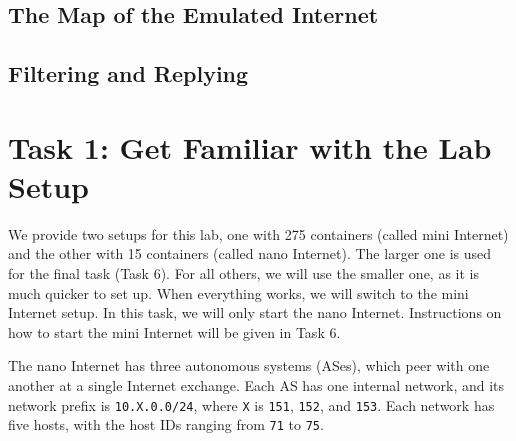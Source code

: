 


\subsection{The Map of the Emulated Internet} 




\subsection{Filtering and Replying} 






\section{Task 1: Get Familiar with the Lab Setup } 

We provide two setups for this lab, 
one with 275 containers (called mini Internet)
and the other with 15 containers (called nano Internet).
The larger one is used for the final task (Task 6). For 
all others, we will use the smaller one, as it is much
quicker to set up. When everything works, we will
switch to the mini Internet setup. In this task, we will
only start the nano Internet. Instructions on how to 
start the mini Internet will be given in Task 6.


The nano Internet has three autonomous systems (ASes), 
which peer with one another at a single Internet exchange.
Each AS has one internal network, and 
its network prefix is \texttt{10.X.0.0/24}, 
where \texttt{X} is \texttt{151}, \texttt{152}, 
and \texttt{153}.  
Each network has five hosts, with the host IDs ranging from
\texttt{71} to \texttt{75}. 


